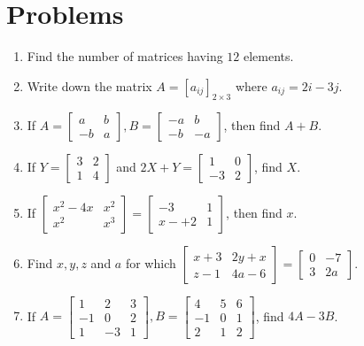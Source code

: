 \section{Problems}
\begin{enumerate}
\item Find the number of matrices having $12$ elements.
\item Write down the matrix $A = [a_{ij}]_{2\times 3}$ where $a_{ij} = 2i - 3j$.
\item If $A= \begin{bmatrix}a & b\\-b & a\end{bmatrix}, B=\begin{bmatrix}-a & b\\-b & -a\end{bmatrix}$, then find $A + B$.
\item If $Y = \begin{bmatrix}3 & 2\\1 & 4\end{bmatrix}$ and $2X + Y = \begin{bmatrix}1 & 0\\-3 & 2\end{bmatrix}$, find $X$.
\item If $\begin{bmatrix}x^2 - 4x & x^2\\x^2 & x^3\end{bmatrix} = \begin{bmatrix}-3 & 1\\ x- + 2 & 1\end{bmatrix}$, then find $x$.
\item Find $x, y, z$ and $a$ for which $\begin{bmatrix}x + 3 & 2y + x \\ z -1 & 4a - 6\end{bmatrix} = \begin{bmatrix}0 & -7 \\ 3 &
    2a\end{bmatrix}$.
\item If $A = \begin{bmatrix}1 & 2 & 3\\-1 & 0 & 2\\1 & -3 & 1\end{bmatrix}, B = \begin{bmatrix}4 & 5 & 6\\ -1 & 0 & 1\\ 2 & 1 &
    2\end{bmatrix}$, find $4A - 3B$.

\end{enumerate}
